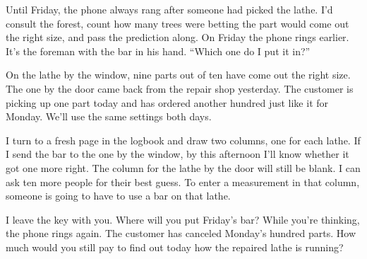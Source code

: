 Until Friday, the phone always rang after someone had picked the lathe. I'd consult the forest, count how many trees were betting the part would come out the right size, and pass the prediction along. On Friday the phone rings earlier. It's the foreman with the bar in his hand. “Which one do I put it in?”

On the lathe by the window, nine parts out of ten have come out the right size. The one by the door came back from the repair shop yesterday. The customer is picking up one part today and has ordered another hundred just like it for Monday. We'll use the same settings both days.

I turn to a fresh page in the logbook and draw two columns, one for each lathe. If I send the bar to the one by the window, by this afternoon I'll know whether it got one more right. The column for the lathe by the door will still be blank. I can ask ten more people for their best guess. To enter a measurement in that column, someone is going to have to use a bar on that lathe.

I leave the key with you. Where will you put Friday's bar? While you're thinking, the phone rings again. The customer has canceled Monday's hundred parts. How much would you still pay to find out today how the repaired lathe is running?
